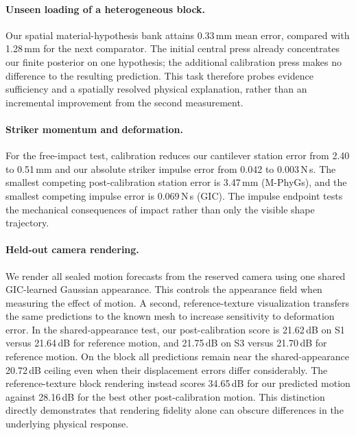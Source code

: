 \paragraph{Unseen loading of a heterogeneous block.}
Our spatial material-hypothesis bank attains 0.33\,mm mean error, compared with 1.28\,mm for the next comparator. The initial central press already concentrates our finite posterior on one hypothesis; the additional calibration press makes no difference to the resulting prediction. This task therefore probes evidence sufficiency and a spatially resolved physical explanation, rather than an incremental improvement from the second measurement.

\paragraph{Striker momentum and deformation.}
For the free-impact test, calibration reduces our cantilever station error from 2.40 to 0.51\,mm and our absolute striker impulse error from 0.042 to 0.003\,N\,s. The smallest competing post-calibration station error is 3.47\,mm (M-PhyGs), and the smallest competing impulse error is 0.069\,N\,s (GIC). The impulse endpoint tests the mechanical consequences of impact rather than only the visible shape trajectory.

\paragraph{Held-out camera rendering.}
We render all sealed motion forecasts from the reserved camera using one shared GIC-learned Gaussian appearance. This controls the appearance field when measuring the effect of motion. A second, reference-texture visualization transfers the same predictions to the known mesh to increase sensitivity to deformation error. In the shared-appearance test, our post-calibration score is 21.62\,dB on S1 versus 21.64\,dB for reference motion, and 21.75\,dB on S3 versus 21.70\,dB for reference motion. On the block all predictions remain near the shared-appearance 20.72\,dB ceiling even when their displacement errors differ considerably. The reference-texture block rendering instead scores 34.65\,dB for our predicted motion against 28.16\,dB for the best other post-calibration motion. This distinction directly demonstrates that rendering fidelity alone can obscure differences in the underlying physical response.

